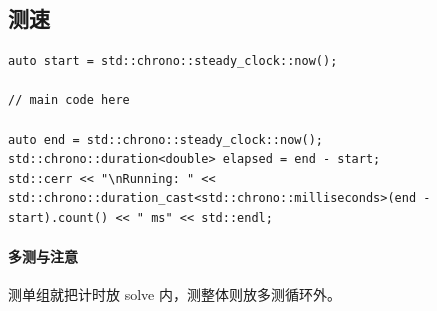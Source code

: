 \subsection{测速}

\begin{lstlisting}
auto start = std::chrono::steady_clock::now();

// main code here

auto end = std::chrono::steady_clock::now();
std::chrono::duration<double> elapsed = end - start;
std::cerr << "\nRunning: " << std::chrono::duration_cast<std::chrono::milliseconds>(end - start).count() << " ms" << std::endl;
\end{lstlisting}

\paragraph{多测与注意} 测单组就把计时放 solve 内，测整体则放多测循环外。
